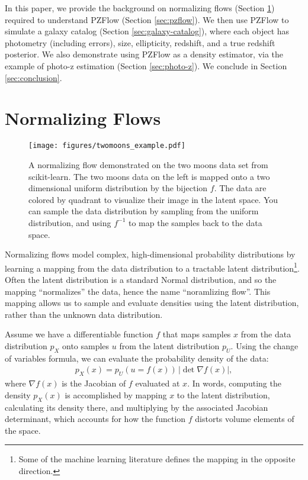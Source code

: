 \documentclass[twocolumn]{aastex631}
\newcommand{\px}{p^{}_{X}}
\newcommand{\pu}{p^{}_{U}}
\begin{document}
In this paper, we provide the background on normalizing flows (Section \ref{sec:nf}) required to understand PZFlow (Section \ref{sec:pzflow}).
We then use PZFlow to simulate a galaxy catalog (Section \ref{sec:galaxy-catalog}), where each object has photometry (including errors), size, ellipticity, redshift, and a true redshift posterior.
We also demonstrate using PZFlow as a density estimator, via the example of photo-z estimation (Section \ref{sec:photo-z}).
We conclude in Section \ref{sec:conclusion}.


\section{Normalizing Flows}
\label{sec:nf}

\begin{figure*}[t!]
    \begin{centering}
        \texttt{[image: figures/twomoons\_example.pdf]}
        \caption{
            A normalizing flow demonstrated on the two moons data set from scikit-learn.
            The two moons data on the left is mapped onto a two dimensional uniform distribution by the bijection $f$.
            The data are colored by quadrant to visualize their image in the latent space.
            You can sample the data distribution by sampling from the uniform distribution, and using $f^{-1}$ to map the samples back to the data space.
        }
        \label{fig:two-moons}
    \end{centering}
\end{figure*}

Normalizing flows model complex, high-dimensional probability distributions by learning a mapping from the data distribution to a tractable latent distribution\footnote{Some of the machine learning literature defines the mapping in the opposite direction.}.
Often the latent distribution is a standard Normal distribution, and so the mapping ``normalizes'' the data, hence the name ``noramlizing flow''.
This mapping allows us to sample and evaluate densities using the latent distribution, rather than the unknown data distribution.

Assume we have a differentiable function $f$ that maps samples $x$ from the data distribution $\px$ onto samples $u$ from the latent distribution $\pu$.
Using the change of variables formula, we can evaluate the probability density of the data:
\begin{align}
    \px(x) = \pu(u=f(x)) \, |\det \nabla f(x)|,
    \label{eq:px}
\end{align}
where $\nabla f(x)$ is the Jacobian of $f$ evaluated at $x$.
In words, computing the density $\px(x)$ is accomplished by mapping $x$ to the latent distribution, calculating its density there, and multiplying by the associated Jacobian determinant, which accounts for how the function $f$ distorts volume elements of the space.
\end{document}
